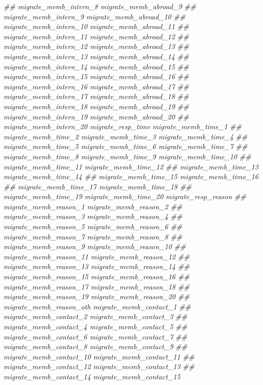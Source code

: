 \documentclass[
]{article}
\newenvironment{Shaded}{\begin{snugshade}}{\end{snugshade}}
\newcommand{\CommentTok}[1]{\textcolor[rgb]{0.56,0.35,0.01}{\textit{#1}}}
\begin{document}
\begin{Shaded}
\begin{Highlighting}[]
\CommentTok{##      migrate_memb_intern_8 migrate_memb_abroad_9}
\CommentTok{##      migrate_memb_intern_9 migrate_memb_abroad_10}
\CommentTok{##      migrate_memb_intern_10 migrate_memb_abroad_11}
\CommentTok{##      migrate_memb_intern_11 migrate_memb_abroad_12}
\CommentTok{##      migrate_memb_intern_12 migrate_memb_abroad_13}
\CommentTok{##      migrate_memb_intern_13 migrate_memb_abroad_14}
\CommentTok{##      migrate_memb_intern_14 migrate_memb_abroad_15}
\CommentTok{##      migrate_memb_intern_15 migrate_memb_abroad_16}
\CommentTok{##      migrate_memb_intern_16 migrate_memb_abroad_17}
\CommentTok{##      migrate_memb_intern_17 migrate_memb_abroad_18}
\CommentTok{##      migrate_memb_intern_18 migrate_memb_abroad_19}
\CommentTok{##      migrate_memb_intern_19 migrate_memb_abroad_20}
\CommentTok{##      migrate_memb_intern_20 migrate_resp_time migrate_memb_time_1}
\CommentTok{##      migrate_memb_time_2 migrate_memb_time_3 migrate_memb_time_4}
\CommentTok{##      migrate_memb_time_5 migrate_memb_time_6 migrate_memb_time_7}
\CommentTok{##      migrate_memb_time_8 migrate_memb_time_9 migrate_memb_time_10}
\CommentTok{##      migrate_memb_time_11 migrate_memb_time_12}
\CommentTok{##      migrate_memb_time_13 migrate_memb_time_14}
\CommentTok{##      migrate_memb_time_15 migrate_memb_time_16}
\CommentTok{##      migrate_memb_time_17 migrate_memb_time_18}
\CommentTok{##      migrate_memb_time_19 migrate_memb_time_20 migrate_resp_reason}
\CommentTok{##      migrate_memb_reason_1 migrate_memb_reason_2}
\CommentTok{##      migrate_memb_reason_3 migrate_memb_reason_4}
\CommentTok{##      migrate_memb_reason_5 migrate_memb_reason_6}
\CommentTok{##      migrate_memb_reason_7 migrate_memb_reason_8}
\CommentTok{##      migrate_memb_reason_9 migrate_memb_reason_10}
\CommentTok{##      migrate_memb_reason_11 migrate_memb_reason_12}
\CommentTok{##      migrate_memb_reason_13 migrate_memb_reason_14}
\CommentTok{##      migrate_memb_reason_15 migrate_memb_reason_16}
\CommentTok{##      migrate_memb_reason_17 migrate_memb_reason_18}
\CommentTok{##      migrate_memb_reason_19 migrate_memb_reason_20}
\CommentTok{##      migrate_memb_reason_oth migrate_memb_contact_1}
\CommentTok{##      migrate_memb_contact_2 migrate_memb_contact_3}
\CommentTok{##      migrate_memb_contact_4 migrate_memb_contact_5}
\CommentTok{##      migrate_memb_contact_6 migrate_memb_contact_7}
\CommentTok{##      migrate_memb_contact_8 migrate_memb_contact_9}
\CommentTok{##      migrate_memb_contact_10 migrate_memb_contact_11}
\CommentTok{##      migrate_memb_contact_12 migrate_memb_contact_13}
\CommentTok{##      migrate_memb_contact_14 migrate_memb_contact_15}

\end{Highlighting}
\end{Shaded}
\end{document}
